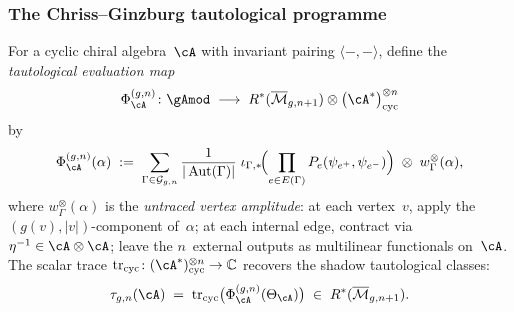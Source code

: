 
\subsubsection{The Chriss--Ginzburg tautological programme}
\label{subsubsec:chriss-ginzburg-tautological-programme}

\begin{construction}
\label{constr:tautological-evaluation-map}
\ClaimStatusProvedHere
{}
For a cyclic chiral algebra~$\cA$ with invariant pairing
$\langle{-},{-}\rangle$, define the
\emph{tautological evaluation map}
\begin{equation}\label{eq:tautological-evaluation-map}
\Phi_{\cA}^{(g,n)}
\colon
\gAmod
\;\longrightarrow\;
R^*(\overline{\mathcal{M}}_{g,n+1})
\otimes \bigl(\cA^*\bigr)^{\otimes n}_{\mathrm{cyc}}
\end{equation}
by
\begin{equation}\label{eq:phi-composite}
\Phi_{\cA}^{(g,n)}(\alpha)
\;:=\;
\sum_{\Gamma \in \mathcal{G}_{g,n}}
\frac{1}{|\operatorname{Aut}(\Gamma)|}
\;\iota_{\Gamma,*}\!\Bigl(
\prod_{e \in E(\Gamma)}
  P_e(\psi_{e^+}, \psi_{e^-})
\Bigr)
\;\otimes\;
w_\Gamma^{\otimes}(\alpha),
\end{equation}
where $w_\Gamma^{\otimes}(\alpha)$ is the \emph{untraced vertex amplitude}:
at each vertex~$v$, apply the $(g(v),|v|)$-component
of~$\alpha$; at each internal edge, contract
via $\eta^{-1} \in \cA \otimes \cA$;
leave the $n$~external outputs as multilinear functionals on~$\cA$.
The scalar trace
$\operatorname{tr}_{\mathrm{cyc}} \colon
(\cA^*)^{\otimes n}_{\mathrm{cyc}} \to \mathbb{C}$
recovers the shadow tautological classes:
\begin{equation}\label{eq:phi-trace-recovery}
\tau_{g,n}(\cA)
\;=\;
\operatorname{tr}_{\mathrm{cyc}}
\bigl(\Phi_{\cA}^{(g,n)}(\Theta_\cA)\bigr)
\;\in\; R^*(\overline{\mathcal{M}}_{g,n+1}).
\end{equation}
\end{construction}

